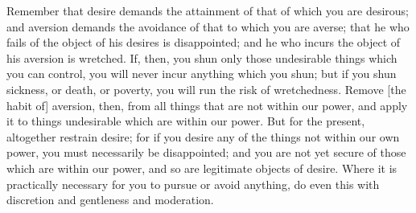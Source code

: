 Remember that desire demands the attainment of that of which you are
desirous; and aversion demands the avoidance of that to which you are
averse; that he who fails of the object of his desires is disappointed;
and he who incurs the object of his aversion is wretched. If, then, you
shun only those undesirable things which you can control, you will never
incur anything which you shun; but if you shun sickness, or death, or
poverty, you will run the risk of wretchedness. Remove [the habit of]
aversion, then, from all things that are not within our power, and apply
it to things undesirable which are within our power. But for the present,
altogether restrain desire; for if you desire any of the things not
within our own power, you must necessarily be disappointed; and you are
not yet secure of those which are within our power, and so are legitimate
objects of desire. Where it is practically necessary for you to pursue or
avoid anything, do even this with discretion and gentleness and
moderation.
